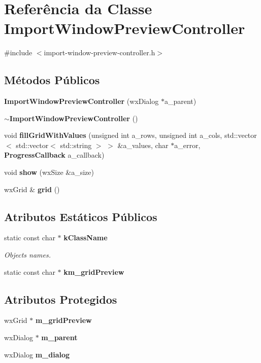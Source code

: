 \section{Referência da Classe Import\+Window\+Preview\+Controller}
\label{class_import_window_preview_controller}


{\ttfamily \#include $<$import-\/window-\/preview-\/controller.\+h$>$}

\subsection*{Métodos Públicos}
\begin{DoxyCompactItemize}
\item 
{\bf Import\+Window\+Preview\+Controller} (wx\+Dialog $\ast$a\+\_\+parent)
\item 
{\bf $\sim$\+Import\+Window\+Preview\+Controller} ()
\item 
void {\bf fill\+Grid\+With\+Values} (unsigned int a\+\_\+rows, unsigned int a\+\_\+cols, std\+::vector$<$ std\+::vector$<$ std\+::string $>$ $>$ \&a\+\_\+values, char $\ast$a\+\_\+error, {\bf Progress\+Callback} a\+\_\+callback)
\item 
void {\bf show} (wx\+Size \&a\+\_\+size)
\item 
wx\+Grid \& {\bf grid} ()
\end{DoxyCompactItemize}
\subsection*{Atributos Estáticos Públicos}
\begin{DoxyCompactItemize}
\item 
static const char $\ast$ {\bf k\+Class\+Name}
\begin{DoxyCompactList}\small\item\em Object\textquotesingle{}s names. \end{DoxyCompactList}\item 
static const char $\ast$ {\bf km\+\_\+grid\+Preview}
\end{DoxyCompactItemize}
\subsection*{Atributos Protegidos}
\begin{DoxyCompactItemize}
\item 
wx\+Grid $\ast$ {\bf m\+\_\+grid\+Preview}
\item 
wx\+Dialog $\ast$ {\bf m\+\_\+parent}
\item 
wx\+Dialog {\bf m\+\_\+dialog}
\end{DoxyCompactItemize}


